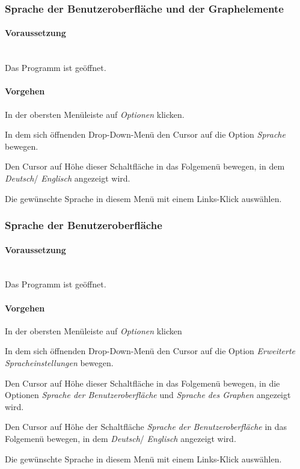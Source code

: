 \documentclass[enabledeprecatedfontcommands,fontsize=11pt,paper=a4,twoside]{scrartcl}
\newcounter{one}
\newcommand*{\condition}{\paragraph{Voraussetzung}$\;$ \vspace{0.2cm}\\}
\newcommand*{\action}{\paragraph{Vorgehen}}
\let\origenumerate\enumerate
\let\origendenumerate\endenumerate
\renewenvironment{enumerate}{\origenumerate \addtolength{\itemsep}{-10.0pt}}{\origendenumerate}
\begin{document}
\subsubsection{Sprache der Benutzeroberfläche und der Graphelemente}
		\condition 	
		Das Programm ist geöffnet.
		\action
		\begin{enumerate}
				\item In der obersten Menüleiste auf \textit{Optionen} klicken. 
				\item In dem sich öffnenden Drop-Down-Menü den Cursor auf die Option \textit{Sprache} bewegen.
				\item Den Cursor auf Höhe dieser Schaltfläche in das Folgemenü bewegen, in dem \textit{Deutsch}/ \textit{Englisch} angezeigt wird.
				\item Die gewünschte Sprache in diesem Menü mit einem Links-Klick auswählen.\\
		\end{enumerate}

\subsubsection{Sprache der Benutzeroberfläche}
		\condition 	
		Das Programm ist geöffnet.
		\action
		\begin{enumerate}
				\item In der obersten Menüleiste auf \textit{Optionen} klicken 
				\item In dem sich öffnenden Drop-Down-Menü den Cursor auf die Option \textit{Erweiterte Spracheinstellungen} bewegen.
				\item Den Cursor auf Höhe dieser Schaltfläche in das Folgemenü bewegen, in die Optionen \textit{Sprache der Benutzeroberfläche} und \textit{Sprache des Graphen} angezeigt wird.
				\item Den Cursor auf Höhe der Schaltfläche \textit{Sprache der Benutzeroberfläche} in das Folgemenü bewegen, in dem \textit{Deutsch}/ \textit{Englisch} angezeigt wird.
				\item Die gewünschte Sprache in diesem Menü mit einem Links-Klick auswählen. \\
		\end{enumerate}
	 		
\end{document}
